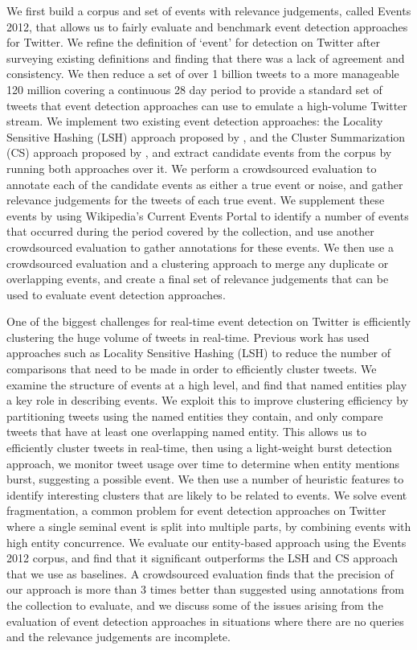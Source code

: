 We first build a corpus and set of events with relevance judgements, called Events 2012, that allows us to fairly evaluate and benchmark event detection approaches for Twitter.
We refine the definition of `event' for detection on Twitter after surveying existing definitions and finding that there was a lack of agreement and consistency.
We then reduce a set of over 1 billion tweets to a more manageable 120 million covering a continuous 28 day period to provide a standard set of tweets that event detection approaches can use to emulate a high-volume Twitter stream.
We implement two existing event detection approaches: the Locality Sensitive Hashing (LSH) approach proposed by \cite{Petrovic10}, and the Cluster Summarization (CS) approach proposed by \cite{Aggarwal12}, and extract candidate events from the corpus by running both approaches over it.
We perform a crowdsourced evaluation to annotate each of the candidate events as either a true event or noise, and gather relevance judgements for the tweets of each true event.
We supplement these events by using Wikipedia's Current Events Portal to identify a number of events that occurred during the period covered by the collection, and use another crowdsourced evaluation to gather annotations for these events.
We then use a crowdsourced evaluation and a clustering approach to merge any duplicate or overlapping events, and create a final set of relevance judgements that can be used to evaluate event detection approaches.

One of the biggest challenges for real-time event detection on Twitter is efficiently clustering the huge volume of tweets in real-time.
Previous work has used approaches such as Locality Sensitive Hashing (LSH) \citep{Petrovic10} to reduce the number of comparisons that need to be made in order to efficiently cluster tweets.
We examine the structure of events at a high level, and find that named entities play a key role in describing events.
We exploit this to improve clustering efficiency by partitioning tweets using the named entities they contain, and only compare tweets that have at least one overlapping named entity.
This allows us to efficiently cluster tweets in real-time, then using a light-weight burst detection approach, we monitor tweet usage over time to determine when entity mentions burst, suggesting a possible event.
We then use a number of heuristic features to identify interesting clusters that are likely to be related to events.
We solve event fragmentation, a common problem for event detection approaches on Twitter where a single seminal event is split into multiple parts, by combining events with high entity concurrence.
We evaluate our entity-based approach using the Events 2012 corpus, and find that it significant outperforms the LSH and CS approach that we use as baselines.
A crowdsourced evaluation finds that the precision of our approach is more than 3 times better than suggested using annotations from the collection to evaluate, and we discuss some of the issues arising from the evaluation of event detection approaches in situations where there are no queries and the relevance judgements are incomplete.

